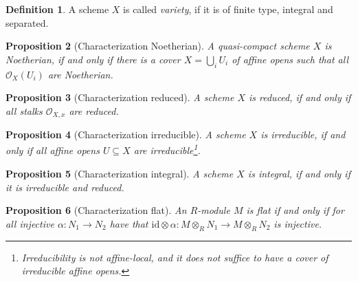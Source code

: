 \documentclass{scrartcl}
\renewcommand{\O}{\mathcal{O}}
\newtheorem{prop}{Proposition}[section]
\theoremstyle{definition}
\newtheorem{definition}[prop]{Definition}
\begin{document}
\begin{definition}
    A scheme $X$ is called \emph{variety}, if it is of finite type, integral and separated.
\end{definition}

\begin{prop}[Characterization Noetherian]
    A quasi-compact scheme $X$ is Noetherian, if and only if there is a cover $X = \bigcup_i U_i$ of affine opens such that all $\O_X(U_i)$ are Noetherian.
\end{prop}

\begin{prop}[Characterization reduced]
    A scheme $X$ is reduced, if and only if all stalks $\O_{X, x}$ are reduced.
\end{prop}

\begin{prop}[Characterization irreducible]
    A scheme $X$ is irreducible, if and only if all affine opens $U \subseteq X$ are irreducible\footnote{Irreducibility is not affine-local, and it does not suffice to have a cover of irreducible affine opens.}. 
\end{prop}

\begin{prop}[Characterization integral]
    A scheme $X$ is integral, if and only if it is irreducible and reduced.
\end{prop}

\begin{prop}[Characterization flat]
    An $R$-module $M$ is flat if and only if for all injective $\alpha: N_1 \to N_2$ have that $\mathrm{id} \otimes \alpha: M \otimes_R N_1 \to M \otimes_R N_2$ is injective.
\end{prop}
\end{document}
